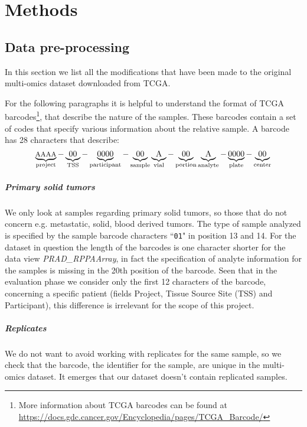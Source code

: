 \chapter{Methods}
\section{Data pre-processing}\label{methods_preProcessing}
In this section we list all the modifications that have been made to the original multi-omics dataset downloaded from TCGA.\newline

For the following paragraphs it is helpful to understand the format of TCGA barcodes\footnote{More information about TCGA barcodes can be found at \url{https://docs.gdc.cancer.gov/Encyclopedia/pages/TCGA_Barcode/}}, that describe the nature of the samples. These barcodes contain a set of codes that specify various information about the relative sample. A barcode has 28 characters that describe:
\begin{equation*}
    \underbrace{\text{\footnotesize AAAA}}_\text{project}-
    \underbrace{\text{00}}_\text{TSS}-
    \underbrace{\text{0000}}_\text{participant}-
    \underbrace{\text{00}}_\text{sample}
    \underbrace{\text{A}}_\text{vial}-
    \underbrace{\text{00}}_\text{portion}
    \underbrace{\text{A}}_\text{analyte}-
    \underbrace{\text{0000}}_\text{plate}-
    \underbrace{\text{00}}_\text{center}
\end{equation*}
\paragraph{Primary solid tumors}
We only look at samples regarding primary solid tumors, so those that do not concern e.g. metastatic, solid, blood derived tumors. The type of sample analyzed is specified by the sample barcode characters ``\texttt{01}" in position 13 and 14.
For the dataset in question the length of the barcodes is one character shorter for the data view \textit{PRAD\_RPPAArray}, in fact the specification of analyte information for the samples is missing in the 20th position of the barcode. Seen that in the evaluation phase we consider only the first 12 characters of the barcode, concerning a specific patient (fields Project, Tissue Source Site (TSS) and Participant), this difference is irrelevant for the scope of this project.
\paragraph{Replicates} We do not want to avoid working with replicates for the same sample, so we check that the barcode, the identifier for the sample, are unique in the multi-omics dataset. It emerges that our dataset doesn't contain replicated samples.
